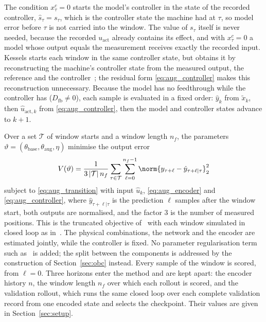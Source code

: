 The condition $x^c_\tau=0$ starts the model's controller in the state of the
recorded controller, $\hat s_\tau=s_\tau$, which is the controller state the
machine had at $\tau$, so model error before $\tau$ is not carried into the
window.
The value of $s_\tau$ itself is never needed, because the recorded
$u_{\mathrm{act}}$ already contains its effect, and with $x^c_\tau=0$ a
model whose output equals the measurement receives exactly the recorded
input.
Kessels starts each window in the same controller state, but obtains it by
reconstructing the machine's controller state from the measured output, the
reference and the controller~\cite[Remark~5.4]{kessels2025ai}; the residual
form \eqref{eq:aug_controller} makes this reconstruction unnecessary.
Because the model has no feedthrough while the controller has
($D_{\mathrm{fb}}\neq0$), each sample is evaluated in a fixed order:
$\hat y_k$ from $\tilde x_k$, then $\hat u_{\mathrm{act},k}$ from
\eqref{eq:aug_controller}, then the model and controller states advance to
$k+1$.

Over a set $\mathcal T$ of window starts and a window length $n_f$, the
parameters $\vartheta=(\theta_{\mathrm{base}},\theta_{\mathrm{aug}},\eta)$
minimise the output error
\begin{equation}
 V(\vartheta)=\frac{1}{3\,|\mathcal T|\,n_f}
 \sum_{\tau\in\mathcal T}\sum_{\ell=0}^{n_f-1}
 \norm{y_{\tau+\ell}-\hat y_{\tau+\ell|\tau}}_2^2
 \label{eq:aug_loss}
\end{equation}
subject to \eqref{eq:aug_transition} with input $\hat u_k$,
\eqref{eq:aug_encoder} and \eqref{eq:aug_controller}, where
$\hat y_{\tau+\ell|\tau}$ is the prediction $\ell$ samples after the window
start, both outputs are normalised, and the factor $3$ is the number of
measured positions.
This is the truncated objective of~\cite[Eq.~(22)]{hoekstra2026lfr} with each
window simulated in closed loop as in~\cite[Eq.~(5.12)]{kessels2025ai}.
The physical combinations, the network and the encoder are estimated jointly,
while the controller is fixed.
No parameter regularisation term such as~\cite[Eq.~(26)]{hoekstra2026lfr} is
added; the split between the components is addressed by the construction of
Section~\ref{sec:obc} instead.
Every sample of the window is scored, from $\ell=0$.
Three horizons enter the method and are kept apart: the encoder history $n$,
the window length $n_f$ over which each rollout is scored, and the
validation rollout, which runs the same closed loop over each complete
validation record from one encoded state and selects the checkpoint.
Their values are given in Section~\ref{sec:setup}.
